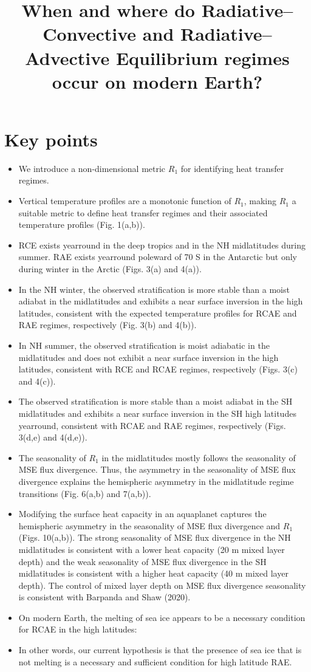 \documentclass{ametsocV5}
\title{When and where do Radiative--Convective and Radiative--Advective Equilibrium regimes occur on modern Earth?}
\affiliation{The University of Chicago, Chicago, Illinois}
\begin{document}
\maketitle

\section*{Key points}
\begin{itemize}
  \item We introduce a non-dimensional metric $R_{1}$ for identifying heat transfer regimes.
\item Vertical temperature profiles are a monotonic function of $R_{1}$, making $R_{1}$ a suitable metric to define heat transfer regimes and their associated temperature profiles (Fig. 1(a,b)).
  \item RCE exists yearround in the deep tropics and in the NH midlatitudes during summer. RAE exists yearround poleward of 70 S in the Antarctic but only during winter in the Arctic (Figs. 3(a) and 4(a)).
  \item In the NH winter, the observed stratification is more stable than a moist adiabat in the midlatitudes and exhibits a near surface inversion in the high latitudes, consistent with the expected temperature profiles for RCAE and RAE regimes, respectively (Fig. 3(b) and 4(b)).
  \item In NH summer, the observed stratification is moist adiabatic in the midlatitudes and does not exhibit a near surface inversion in the high latitudes, consistent with RCE and RCAE regimes, respectively (Figs. 3(c) and 4(c)).
  \item The observed stratification is more stable than a moist adiabat in the SH midlatitudes and exhibits a near surface inversion in the SH high latitudes yearround, consistent with RCAE and RAE regimes, respectively (Figs. 3(d,e) and 4(d,e)).
  \item The seasonality of $R_{1}$ in the midlatitudes mostly follows the seasonality of MSE flux divergence. Thus, the asymmetry in the seasonality of MSE flux divergence explains the hemispheric asymmetry in the midlatitude regime transitions (Fig. 6(a,b) and 7(a,b)).
  \item Modifying the surface heat capacity in an aquaplanet captures the hemispheric asymmetry in the seasonality of MSE flux divergence and $R_{1}$ (Figs. 10(a,b)). The strong seasonality of MSE flux divergence in the NH midlatitudes is consistent with a lower heat capacity (20 m mixed layer depth) and the weak seasonality of MSE flux divergence in the SH midlatitudes is consistent with a higher heat capacity (40 m mixed layer depth). The control of mixed layer depth on MSE flux divergence seasonality is consistent with Barpanda and Shaw (2020).
  \item On modern Earth, the melting of sea ice appears to be a necessary condition for RCAE in the high latitudes:
  \item In other words, our current hypothesis is that the presence of sea ice that is not melting is a necessary and sufficient condition for high latitude RAE.
\end{itemize}
\end{document}
